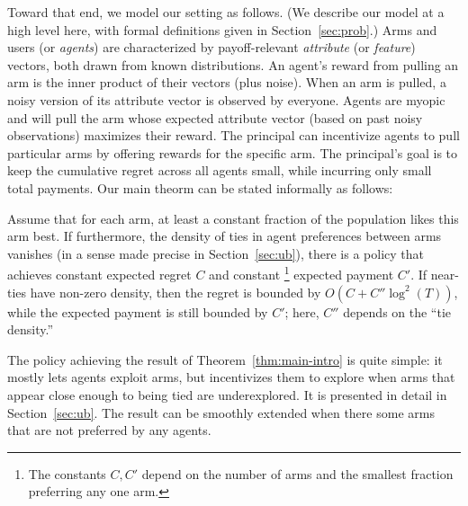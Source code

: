 
Toward that end, we model our setting as follows.
(We describe our model at a high level here,
with formal definitions given in Section~\ref{sec:prob}.)
Arms and users (or \emph{agents}) are characterized by payoff-relevant
\emph{attribute} (or \emph{feature}) vectors,
both drawn from known distributions.
An agent's reward from pulling an arm is the inner product of their
vectors (plus noise).
When an arm is pulled, a noisy version of its attribute vector is
observed by everyone.
Agents are myopic and will pull the arm whose expected attribute
vector (based on past noisy observations) maximizes their reward.
The principal can incentivize agents to pull particular arms by
offering rewards for the specific arm.
The principal's goal is to keep the cumulative regret across all
agents small, while incurring only small total payments.
Our main theorm can be stated informally as follows:

\begin{theorem} \label{thm:main-intro}
Assume that for each arm, at least a constant fraction of the
population likes this arm best.
If furthermore, the density of ties in agent preferences between arms
vanishes (in a sense made precise in Section~\ref{sec:ub}),
there is a policy that achieves constant
expected regret $C$ and constant%
\footnote{The constants $C,C'$ depend on the number of arms and the
  smallest fraction preferring any one arm.} expected payment $C'$.
If near-ties have non-zero density,
then the regret is bounded by $O(C + C'' \log^2(T))$,
while the expected payment is still bounded by $C'$;
here, $C''$ depends on the ``tie density.''
\end{theorem}

The policy achieving the result of Theorem~\ref{thm:main-intro} is
quite simple: it mostly lets agents exploit arms, but incentivizes
them to explore when arms that appear close enough to being tied are
underexplored. It is presented in detail in Section~\ref{sec:ub}.
The result can be smoothly extended when there some arms that are not
preferred by any agents.

